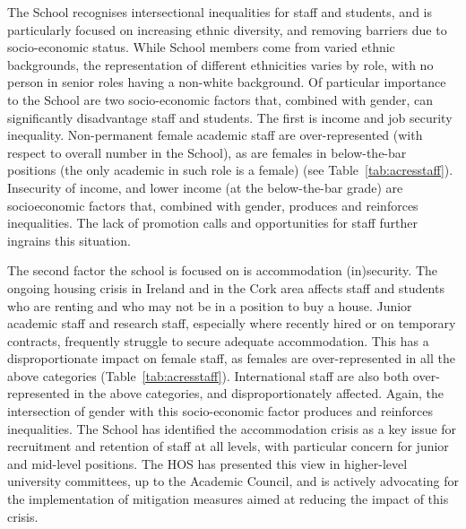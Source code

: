 The School recognises intersectional inequalities for staff and students, and is particularly focused on increasing ethnic diversity, and removing barriers due to socio-economic status.
While School members come from varied ethnic backgrounds, the representation of different ethnicities varies by role, with no person in senior roles having a non-white background.
Of particular importance to the School are two socio-economic factors that, combined with gender, can significantly disadvantage staff and students. The first is income and job security inequality. Non-permanent female academic staff are over-represented (with respect to overall number in the School), as are females in below-the-bar positions (the only academic in such role is a female) (see Table~\ref{tab:acresstaff}). Insecurity of income, and lower income (at the below-the-bar grade) are socioeconomic factors that, combined with gender, produces and reinforces inequalities.
The lack of promotion calls and opportunities for staff further ingrains this situation. %

The second factor the school is focused on is accommodation (in)security. The ongoing housing crisis in Ireland and in the Cork area affects staff and students who are renting and who may not be in a position to buy a house. Junior academic staff and research staff, especially where recently hired or on temporary contracts, frequently struggle to secure adequate accommodation. This has a disproportionate impact on female staff, as females are over-represented in all the above categories (Table~\ref{tab:acresstaff}). International staff are also both over-represented in the above categories, and disproportionately affected. Again, the intersection of gender with this socio-economic factor produces and reinforces inequalities. The School has identified the accommodation crisis as a key issue for recruitment and retention of staff at all levels, with particular concern for junior and mid-level positions. The \ac{HOS} has presented this view in higher-level university committees, up to the Academic Council, and is actively advocating for the implementation of mitigation measures aimed at reducing the impact of this crisis.

